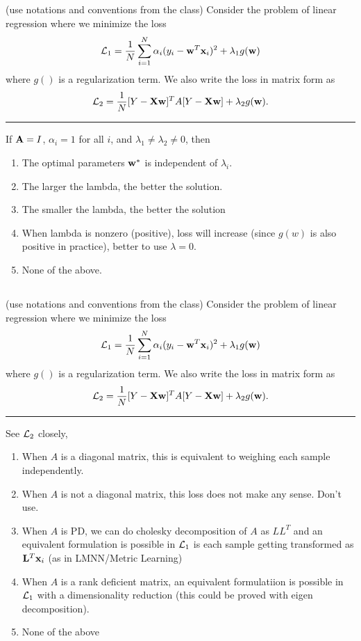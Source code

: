 \begin{frame}
\section{}
(use notations  and conventions from the class) Consider the problem of linear regression where we
minimize the loss
\[{\cal L}_1 = \frac{1}{N}\sum_{i=1}^N \alpha_i (y_i - {\bf w}^T{\bf x}_i)^2 + \lambda_1 g({\bf w})\] where $g()$ is a regularization term. We also write the loss in matrix form as \[ {\cal L}_2 = \frac{1}{N} [Y-{\bf X}{\bf w}]^TA[Y-{\bf X}{\bf w}] + \lambda_2 g({\bf w}). \]

\hrule

If ${\bf A} = I$, $\alpha_i = 1$ for all $i$, and $\lambda_1 \neq \lambda_2 \neq 0$, then
\begin{enumerate}
\item The optimal parameters ${\bf w}^*$ is independent of $\lambda_i$.
\item The larger the lambda, the better the solution.
\item The smaller the lambda, the better the
solution
\item When lambda is nonzero (positive), loss will increase (since $g(w)$ is also positive in practice), better to use $\lambda=0$.
\item None of the above.    %
\end{enumerate}
\end{frame}

\begin{frame}
\section{}
(use notations  and conventions from the class) Consider the problem of linear regression where we
minimize the loss
\[{\cal L}_1 = \frac{1}{N}\sum_{i=1}^N \alpha_i (y_i - {\bf w}^T{\bf x}_i)^2 + \lambda_1 g({\bf w})\] where $g()$ is a regularization term. We also write the loss in matrix form as \[ {\cal L}_2 = \frac{1}{N} [Y-{\bf X}{\bf w}]^TA[Y-{\bf X}{\bf w}] + \lambda_2 g({\bf w}). \]

\hrule
See ${\cal L}_2$ closely,
\begin{enumerate}
\item When $A$ is a diagonal matrix, this is equivalent to weighing each sample independently.    %
\item When $A$ is not a  diagonal matrix, this loss does not make any sense. Don't use.
\item When $A$ is PD, we can do cholesky decomposition of $A$ as $LL^T$ and an equivalent formulation is possible in ${\cal L}_1$ is each sample getting transformed as ${\bf L}^T{\bf x}_i$ (as in LMNN/Metric Learning)   %
\item When $A$ is a rank deficient matrix, an equivalent formulatiion is possible in ${\cal L}_1$ with a dimensionality reduction (this could be proved with eigen decomposition).    %
\item None of the above
\end{enumerate}
\end{frame}

